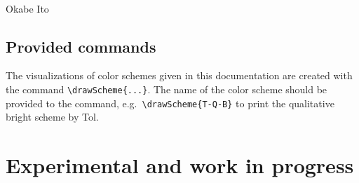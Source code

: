\documentclass{scrartcl}
\newcommand\marg[1]{\leavevmode\marginpar{\raggedleft #1}}
\begin{document}
\begin{center}
    \\
    Okabe Ito
\end{center}

\subsection{Provided commands}
\cprotect\marg{\verb!\drawScheme{...}!}%
The visualizations of color schemes given in this documentation are created with the command \verb!\drawScheme{...}!.
The name of the color scheme should be provided to the command, e.g.\ \verb!\drawScheme{T-Q-B}! to print the qualitative bright scheme by Tol.


\section{Experimental and work in progress}

\let\oldcolor\color

\newcommand\normalvision{%
    \protect\renewcommand\color[1]{\oldcolor{##1}}%
}

\newcommand\protanopia{%
    \protect\renewcommand\color[1]{%
        \extractcolorspecs{##1}{\modelspec}{\colorspec}%
        \tikzmath{
            \r = array({\colorspec},0);
            \g = array({\colorspec},1);
            \b = array({\colorspec},2);
            \rp = pow(0.06425 + 0.677*pow(\g, 2.2) + 0.2802*pow(\r, 2.2), 1./2.2);
            \gp = pow(0.06425 + 0.677*pow(\g, 2.2) + 0.2802*pow(\r, 2.2), 1./2.2);
            \bp = pow(0.06425 + 0.95724*pow(\b, 2.2) + 0.02138*pow(\g, 2.2) - 0.02138*pow(\r, 2.2), 1./2.2);
        }%
        \oldcolor[rgb]{\rp,\gp,\bp}%
    }%
}

\newcommand\deuteranopia{%
    \protect\renewcommand\color[1]{%
        \extractcolorspecs{##1}{\modelspec}{\colorspec}%
        \tikzmath{
            \r = array({\colorspec},0);
            \g = array({\colorspec},1);
            \b = array({\colorspec},2);
            \rp = pow(0.01194 + 0.8806*pow(\g, 2.2) + 0.1115*pow(\r, 2.2), 1./2.2);
            \gp = pow(0.01194 + 0.8806*pow(\g, 2.2) + 0.1115*pow(\r, 2.2), 1./2.2);
            \bp = pow(0.01194 + 0.992052*pow(\b, 2.2) - 0.003974*pow(\g, 2.2) + 0.003974*pow(\r, 2.2), 1./2.2);
        }%
        \oldcolor[rgb]{\rp,\gp,\bp}%
    }%
}
\end{document}

